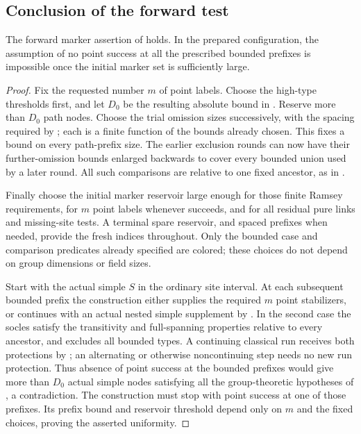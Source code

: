 \subsection{Conclusion of the forward test}
\begin{proposition}
\label{fb:forward-completion}
The forward marker assertion of  holds.  In the
prepared configuration, the assumption of no point success at all the
prescribed bounded prefixes is impossible once the initial marker set is
sufficiently large.
\end{proposition}
\begin{proof}

Fix the requested number \(m\) of point labels.  Choose the high-type
thresholds first, and let \(D_0\) be the resulting absolute bound in
.  Reserve more than \(D_0\) path nodes.  Choose
the trial omission sizes successively, with the spacing required by
; each is a finite function of the bounds
already chosen.  This fixes a bound on every path-prefix size.
The earlier exclusion rounds can now have their further-omission
bounds enlarged backwards to cover every bounded union used by a
later round.  All such comparisons are relative to one fixed
ancestor, as in .

Finally choose the initial marker reservoir large enough for those
finite Ramsey requirements, for \(m\) point labels whenever
 succeeds, and for all residual pure links and
missing-site tests.  A terminal spare reservoir, and spaced prefixes
when needed, provide the fresh indices throughout.  Only the bounded
case and comparison predicates already specified are colored; these
choices do not depend on group dimensions or field sizes.

Start with the actual simple \(S\) in the ordinary site interval.
At each subsequent bounded prefix the construction either supplies
the required \(m\) point stabilizers, or continues with an actual
nested simple supplement by .  In the second
case the socles satisfy the transitivity and full-spanning properties
relative to every ancestor, and  excludes all
bounded types.  A continuing classical run receives both protections
by ;
an alternating or otherwise noncontinuing step needs no new run
protection.  Thus absence of point success at the bounded prefixes
would give more than \(D_0\) actual simple nodes satisfying all the
group-theoretic hypotheses of , a contradiction.
The construction must stop with point success at one of those
prefixes.  Its prefix bound and reservoir threshold depend only on
\(m\) and the fixed choices, proving the asserted uniformity.

\end{proof}
